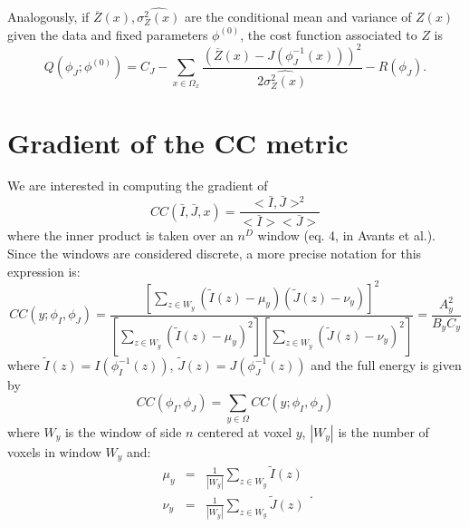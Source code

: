 Analogously, if $\overline{Z}(x), \widehat{\sigma^{2}_{Z}(x)}$ are the conditional mean and variance of $Z(x)$ given the data
and fixed parameters $\phi^{(0)}$, the cost function associated to $Z$ is
\begin{equation}
    Q(\phi_{J}; \phi^{(0)}) = C_{J} - \sum_{x\in\Omega_{x}}\frac{(\overline{Z}(x) - J(\phi^{-1}_{J}(x)))^{2}}{2\widehat{\sigma^{2}_{Z}(x)}} - R(\phi_{J}).
\end{equation}


\pagebreak
\section{Gradient of the CC metric}\label{ap:CC_gradient}
We are interested in computing the gradient of
\begin{equation}
    CC(\bar{I}, \bar{J}, x) = \frac{<\bar{I}, \bar{J}>^{2}}{<\bar{I}><\bar{J}>}
\end{equation}
where the inner product is taken over an $n^{D}$ window (eq. 4, in Avants et al.\cite{Avants2008}). Since the windows are considered discrete, a more precise notation
for this expression is:
\begin{equation}
    CC(y;\phi_{I}, \phi_{J}) = \frac{\left[\sum_{z\in W_{y}} \left(\tilde{I}(z) - \mu_{y}\right)\left(\tilde{J}(z) - \nu_{y}\right)\right]^{2}}
    {\left[\sum_{z \in W_{y}}\left(\tilde{I}(z) - \mu_{y}\right)^{2}\right] \left[\sum_{z \in W_{y}}\left(\tilde{J}(z) - \nu_{y}\right)^{2}\right]} = \frac{A_{y}^{2}}{B_{y}C_{y}}
\end{equation}
where $\tilde{I}(z) = I(\phi_{I}^{-1}(z))$, $\tilde{J}(z) = J(\phi_{J}^{-1}(z))$ and the full energy is given by
\begin{equation}
    CC(\phi_{I}, \phi_{J}) = \sum_{y\in\Omega} CC(y; \phi_{I}, \phi_{J})
\end{equation}
where $W_{y}$ is the window of side $n$ centered at voxel $y$, $|W_{y}|$ is the number of voxels in window $W_{y}$ and:
\begin{equation}
    \begin{array}{lll}
        \mu_{y} &=& \frac{1}{|W_{y}|}\sum_{z \in W_{y}}\tilde{I}(z)\\
        \nu_{y} &=& \frac{1}{|W_{y}|}\sum_{z \in W_{y}}\tilde{J}(z)\\
    \end{array}.
\end{equation}

